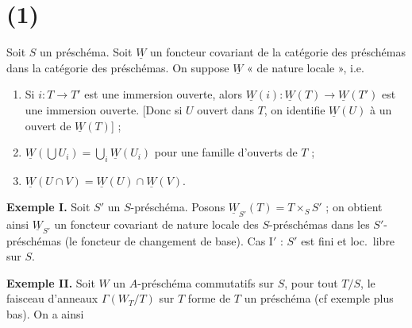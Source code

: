 \documentclass[11pt,a4paper]{article}
\begin{document}
\section{(1)   }

Soit $S$ un préschéma. \struck{\ill{}}
Soit $\underline{W}$ un foncteur covariant de la
catégorie des préschémas dans la
catégorie des préschémas.
On suppose $\underline{W}$ « de nature locale », i.e.
\begin{enumerate}
  \item[(i)] Si $i\colon T\to T'$ est une immersion ouverte,
  alors $\underline{W}(i)\colon\underline{W}(T)\to\underline{W}(T')$ est une
  immersion ouverte. [Donc si $U$ ouvert dans
  $T$, on identifie $\underline{W}(U)$ à un ouvert
  de $\underline{W}(T)$] ;
  \item[(ii)] $\underline{W}(\bigcup U_i)=\bigcup_i\underline{W}(U_i)$ pour une
  famille d'ouverts de $T$ ;
  \item[(iii)] $\underline{W}(U\cap V)=\underline{W}(U)\cap\underline{W}(V)$.
\end{enumerate}

\textbf{Exemple I.} Soit $S'$ un $S$-préschéma.
Posons $\underline{W}_{S'}(T)=T\times_S S'$ ; on obtient ainsi
$\underline{W}_{S'}$ un foncteur covariant de nature locale
des $S$-préschémas dans les $S'$-préschémas (le foncteur
de changement de base).
Cas I$'$ : $S'$ est fini et loc.\ libre sur $S$.

\textbf{Exemple II.} Soit $W$ un $A$-préschéma 
\ill{} commutatifs sur $S$,  \ill{}
pour tout $T/S$, le faisceau d'anneaux
$\Gamma(W_T/T)$ sur $T$ forme de $T$ un
préschéma (cf exemple plus bas). On a ainsi
\end{document}
